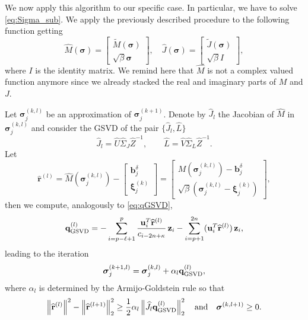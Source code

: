\documentclass[final,leqno]{siamltex}
\newcommand{\norm}[1]{\left\| #1 \right\|}
\newcommand{\sigmab}{\boldsymbol{\sigma}}
\newcommand{\xib}{\boldsymbol{\xi}}
\newcommand{\bm}[1]{\mathbf{#1}}
\begin{document}
We now apply this algorithm to our specific case. In particular, we have to solve \eqref{eq:Sigma_sub}. We apply the previously described procedure to the following function getting
\begin{equation}\label{jacobian}
\widehat{M}(\sigmab)= \begin{bmatrix}
\widetilde M(\sigmab)\\\sqrt{\beta}\sigmab
\end{bmatrix}, \quad
\widehat{J}(\sigmab)=\begin{bmatrix}
\widetilde J(\sigmab)\\\sqrt{\beta}I
\end{bmatrix},
\end{equation}
where $I$ is the identity matrix. We remind here that $\widehat{M}$ is not a complex valued function anymore since we already stacked the real and imaginary parts of $M$ and $J$.

Let $\sigmab_j^{(k,l)}$ be an approximation of $\sigmab_j^{(k+1)}$. Denote by $\widehat{J}_l$ the Jacobian of $\widehat{M}$ in $\sigmab_j^{(k,l)}$ and consider the GSVD of the pair $\{\widehat{J}_l,\widehat L\}$ 
$$
\widehat{J}_l = \widehat U \widehat \Sigma_J \widehat Z^{-1}, \qquad \widehat L = \widehat V \widehat \Sigma_L \widehat Z^{-1}.
$$ 
Let 
$$
\widehat{\bm{r}}^{(l)}=\widehat{M}(\sigmab_j^{(k,l)})-\begin{bmatrix}
\bm{b}_j^\delta\\\xib^{(k)}_j
\end{bmatrix}=\begin{bmatrix}
M(\sigmab_j^{(k,l)})-\bm{b}_j^\delta\\\sqrt{\beta}(\sigmab_j^{(k,l)}-\xib^{(k)}_j)\end{bmatrix},
$$
then we compute, analogously to \eqref{eq:qGSVD},
$$
\mathbf{q}^{(l)}_{\rm GSVD} = -\sum_{i=p-\ell+1}^p
\frac{\mathbf{u}_i^T\widehat{\mathbf{r}}^{(l)}}{c_{i-2n+\kappa}}\, \mathbf{z}_i
- \sum_{i=p+1}^{2n} (\mathbf{u}_i^T\widehat{\mathbf{r}}^{(l)})\, \mathbf{z}_i,
$$
leading to the iteration
$$
\sigmab_j^{(k+1,l)}=\sigmab_j^{(k,l)}+\alpha_l\mathbf{q}^{(l)}_{\rm GSVD},
$$
where $\alpha_l$ is determined by the Armijo-Goldstein rule so that
$$
\norm{\widehat{\mathbf{r}}^{(l)}}^2 - \norm{\widehat{\mathbf{r}}^{(l+1)}}_2^2 \geq \frac{1}{2} \alpha_l \norm{\widehat{J}_l\mathbf{q}^{(l)}_{\rm GSVD}}_2^2\quad\mbox{and}\quad\sigmab^{(k,l+1)}\geq0.
$$
\end{document}
